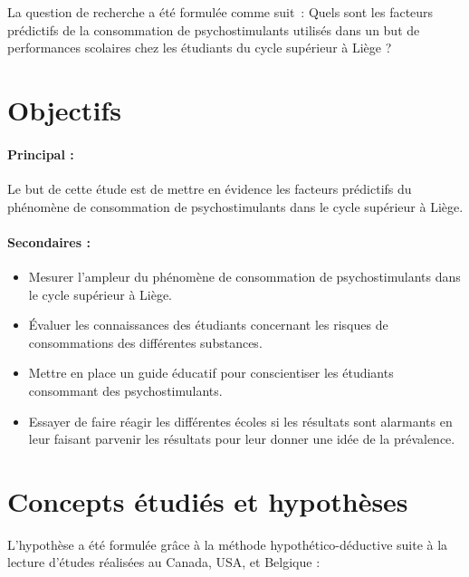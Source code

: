 La question de recherche a été formulée comme suit~: \guillemotleft Quels sont les facteurs prédictifs de la consommation de psychostimulants utilisés dans un but de performances scolaires chez les étudiants du cycle supérieur à Liège ? \guillemotright \newline


\section{Objectifs}

\paragraph{Principal :} 

Le but de cette étude est de mettre en évidence les facteurs prédictifs du phénomène de consommation de psychostimulants dans le cycle supérieur à Liège.
\newline

\paragraph{Secondaires : \newline } 
\begin{itemize}

    \item Mesurer l'ampleur du phénomène de consommation de psychostimulants dans le cycle supérieur à Liège.

    \item Évaluer les connaissances des étudiants concernant les risques de consommations des différentes substances.
    
    \item Mettre en place un guide éducatif pour conscientiser les étudiants consommant des psychostimulants.  
    
    \item Essayer de faire réagir les différentes écoles si les résultats sont alarmants en leur faisant parvenir les résultats pour leur donner une idée de la prévalence.

\end{itemize}



\section{Concepts étudiés et hypothèses}

L'hypothèse a été formulée grâce à la méthode hypothético-déductive suite à la lecture d'études réalisées au Canada, USA, et Belgique \parencite{carton_dopage_2018, sabbe_use_2022, noauthor_prevention_2016} : 

